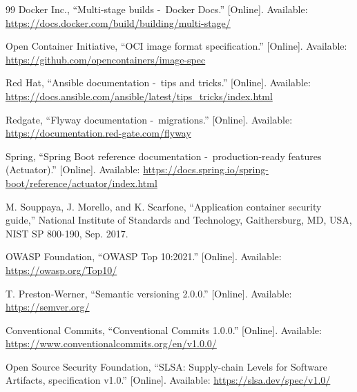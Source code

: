 \documentclass[10pt,a4paper]{article}
\begin{document}
{\begin{thebibliography}{99}
 Docker Inc., ``Multi-stage builds -\ Docker Docs.'' [Online].
Available: \url{https://docs.docker.com/build/building/multi-stage/}

 Open Container Initiative, ``OCI image format specification.'' [Online].
Available: \url{https://github.com/opencontainers/image-spec}

 Red Hat, ``Ansible documentation -\ tips and tricks.'' [Online].
Available: \url{https://docs.ansible.com/ansible/latest/tips_tricks/index.html}

 Redgate, ``Flyway documentation -\ migrations.'' [Online]. Available:
\url{https://documentation.red-gate.com/flyway}

 Spring, ``Spring Boot reference documentation -\ production-ready
features (Actuator).'' [Online]. Available:
\url{https://docs.spring.io/spring-boot/reference/actuator/index.html}

 M. Souppaya, J. Morello, and K. Scarfone, ``Application container security
guide,'' National Institute of Standards and Technology, Gaithersburg, MD, USA,
NIST SP 800-190, Sep. 2017.

 OWASP Foundation, ``OWASP Top 10:2021.'' [Online]. Available:
\url{https://owasp.org/Top10/}

 T. Preston-Werner, ``Semantic versioning 2.0.0.'' [Online]. Available:
\url{https://semver.org/}

 Conventional Commits, ``Conventional Commits 1.0.0.'' [Online]. Available:
\url{https://www.conventionalcommits.org/en/v1.0.0/}

 Open Source Security Foundation, ``SLSA: Supply-chain Levels for Software
Artifacts, specification v1.0.'' [Online]. Available: \url{https://slsa.dev/spec/v1.0/}

\end{thebibliography}}
\end{document}
